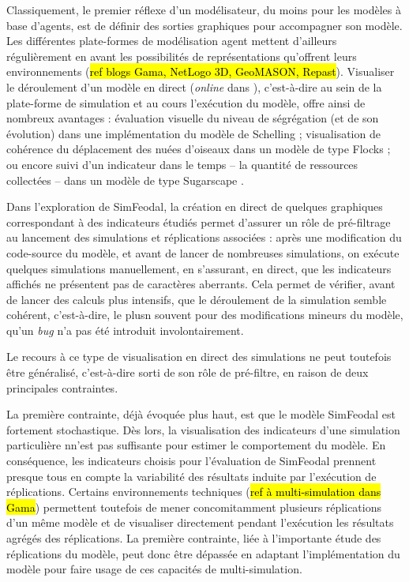 	Classiquement, le premier réflexe d'un modélisateur, du moins pour les modèles à base d'agents, est de définir des sorties graphiques pour accompagner son modèle.
	Les différentes plate-formes de modélisation agent mettent d'ailleurs régulièrement en avant les possibilités de représentations qu'offrent leurs environnements (\hl{ref blogs Gama, NetLogo 3D, GeoMASON, Repast}).
	Visualiser le déroulement d'un modèle \og en direct\fg{} (\og \textit{online}\fg{} dans \cite{grignard_agent-based_2017}), c'est-à-dire au sein de la plate-forme de simulation et au cours l'exécution du modèle, offre ainsi de nombreux avantages : évaluation visuelle du niveau de ségrégation (et de son évolution) dans une implémentation du modèle de Schelling ; visualisation de cohérence du déplacement des nuées d'oiseaux dans un modèle de type \og Flocks\fg{} \autocite{reynolds_flocks_1987} ; ou encore suivi d'un indicateur dans le temps -- la quantité de ressources collectées -- dans un modèle de type \og Sugarscape\fg{} \autocite{epstein_growing_1996}.

	Dans l'exploration de SimFeodal, la création en direct de quelques graphiques correspondant à des indicateurs étudiés permet d'assurer un rôle de pré-filtrage au lancement des simulations et réplications associées : 
	après une modification du code-source du modèle, et avant de lancer de nombreuses simulations, on exécute quelques simulations \og manuellement\fg{}, en s'assurant, en direct, que les indicateurs affichés ne présentent pas de caractères aberrants.
	Cela permet de vérifier, avant de lancer des calculs plus intensifs, que le déroulement de la simulation semble cohérent, c'est-à-dire, le plusn souvent pour des modifications mineurs du modèle,  qu'un \textit{bug} n'a pas été introduit involontairement.
	
	Le recours à ce type de visualisation en direct des simulations ne peut toutefois être généralisé, c'est-à-dire sorti de son rôle de pré-filtre, en raison de deux principales contraintes.

	La première contrainte, déjà évoquée plus haut, est que le modèle SimFeodal est fortement stochastique.
	Dès lors, la visualisation des indicateurs d'une simulation particulière nn'est pas suffisante pour estimer le comportement du modèle.
	En conséquence, les indicateurs choisis pour l'évaluation de SimFeodal prennent presque tous en compte la variabilité des résultats induite par l'exécution de réplications.
	Certains environnements techniques (\hl{ref à multi-simulation dans Gama}) permettent toutefois de mener concomitamment plusieurs réplications d'un même modèle et de visualiser directement pendant l'exécution les résultats agrégés des réplications.
	La première contrainte, liée à l'importante étude des réplications du modèle, peut donc être dépassée en adaptant l'implémentation du modèle pour faire usage de ces capacités de multi-simulation.

